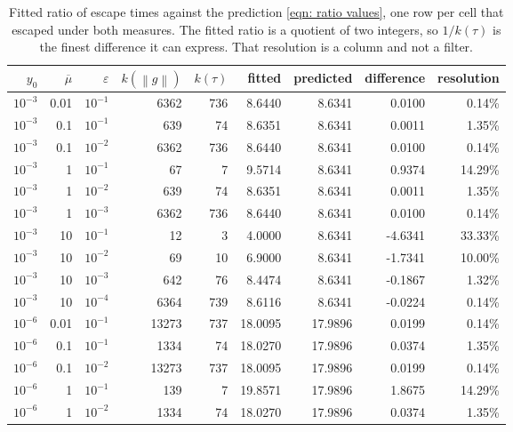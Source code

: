 \documentclass[11pt,a4paper]{article}
\providecommand{\norm}[1]{\left \lVert #1 \right \rVert}
\theoremstyle{definition}
\theoremstyle{remark}
\begin{document}
\begin{table}[H]
  \centering\footnotesize
  \caption{Fitted ratio of escape times against the prediction
    \eqref{eqn: ratio values}, one row per cell that escaped under both measures.
    The fitted ratio is a quotient of two integers, so $1/k(\tau)$ is the finest
    difference it can express. That resolution is a column and not a filter.}
  \label{tab: measures}
  \begin{tabular}{rrrrrrrrr}
    \toprule
    $y_0$ & $\overline{\mu}$ & $\varepsilon$ & $k(\norm{g})$ & $k(\tau)$
      & fitted & predicted & difference & resolution \\
    \midrule
    $10^{-3}$ & 0.01 & $10^{-1}$ & 6362 & 736 &  8.6440 &  8.6341 &   0.0100 & 0.14\% \\
    $10^{-3}$ & 0.1  & $10^{-1}$ &  639 &  74 &  8.6351 &  8.6341 &   0.0011 & 1.35\% \\
    $10^{-3}$ & 0.1  & $10^{-2}$ & 6362 & 736 &  8.6440 &  8.6341 &   0.0100 & 0.14\% \\
    $10^{-3}$ & 1    & $10^{-1}$ &   67 &   7 &  9.5714 &  8.6341 &   0.9374 & 14.29\% \\
    $10^{-3}$ & 1    & $10^{-2}$ &  639 &  74 &  8.6351 &  8.6341 &   0.0011 & 1.35\% \\
    $10^{-3}$ & 1    & $10^{-3}$ & 6362 & 736 &  8.6440 &  8.6341 &   0.0100 & 0.14\% \\
    $10^{-3}$ & 10   & $10^{-1}$ &   12 &   3 &  4.0000 &  8.6341 &  -4.6341 & 33.33\% \\
    $10^{-3}$ & 10   & $10^{-2}$ &   69 &  10 &  6.9000 &  8.6341 &  -1.7341 & 10.00\% \\
    $10^{-3}$ & 10   & $10^{-3}$ &  642 &  76 &  8.4474 &  8.6341 &  -0.1867 & 1.32\% \\
    $10^{-3}$ & 10   & $10^{-4}$ & 6364 & 739 &  8.6116 &  8.6341 &  -0.0224 & 0.14\% \\
    \midrule
    $10^{-6}$ & 0.01 & $10^{-1}$ & 13273 & 737 & 18.0095 & 17.9896 &   0.0199 & 0.14\% \\
    $10^{-6}$ & 0.1  & $10^{-1}$ &  1334 &  74 & 18.0270 & 17.9896 &   0.0374 & 1.35\% \\
    $10^{-6}$ & 0.1  & $10^{-2}$ & 13273 & 737 & 18.0095 & 17.9896 &   0.0199 & 0.14\% \\
    $10^{-6}$ & 1    & $10^{-1}$ &   139 &   7 & 19.8571 & 17.9896 &   1.8675 & 14.29\% \\
    $10^{-6}$ & 1    & $10^{-2}$ &  1334 &  74 & 18.0270 & 17.9896 &   0.0374 & 1.35\% \\

\end{tabular}
\end{table}
\end{document}
